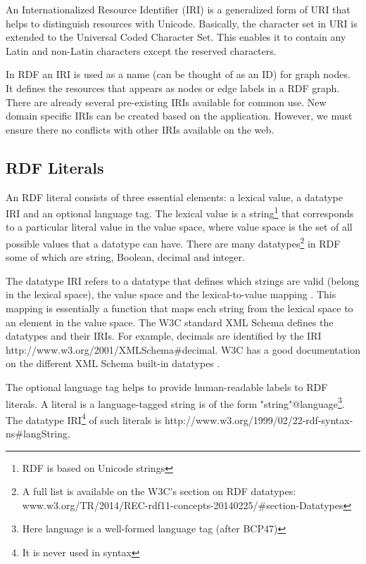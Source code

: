 An Internationalized Resource Identifier (\acrshort{IRI}) is a generalized form of URI that helps to distinguish resources with Unicode. Basically, the character set in URI is extended to the Universal Coded Character Set. This enables it to contain any Latin and non-Latin characters except the reserved characters.

In RDF an IRI is used as a name (can be thought of as an ID) for graph nodes. It defines the resources that appears as nodes or edge labels in a RDF graph. There are already several pre-existing IRIs available for common use. New domain specific IRIs can be created based on the application. However, we must ensure there no conflicts with other IRIs available on the web.

\subsection*{RDF Literals}

An RDF literal consists of three essential elements: a lexical value, a datatype IRI and an optional language tag. The lexical value is a string\footnote{RDF is based on Unicode strings} that corresponds to a particular literal value in the value space, where value space is the set of all possible values that a datatype can have. There are many datatypes\footnote{A full list is available on the W3C's section on RDF datatypes: www.w3.org/TR/2014/REC-rdf11-concepts-20140225/\#section-Datatypes} in RDF some of which are string, Boolean, decimal and integer.

The datatype IRI refers to a datatype that defines which strings are valid (belong in the lexical space), the value space and the lexical-to-value mapping \cite{ Bonduel2019}. This mapping is essentially a function that maps each string from the lexical space to an element in the value space. The \acrshort{W3C} standard XML Schema defines the datatypes and their IRIs. For example, decimals are identified by the IRI http://www.w3.org/2001/XMLSchema\#decimal. W3C has a good documentation on the different XML Schema built-in datatypes \cite{ R.Cyganiak2014}.

The optional language tag helps to provide human-readable labels to RDF literals. A literal is a language-tagged string is of the form "string"@language\footnote{Here language is a well-formed language tag (after \acrshort{BCP47})}. The datatype IRI\footnote{It is never used in syntax} of such literals is http://www.w3.org/1999/02/22-rdf-syntax-ns\#langString.

